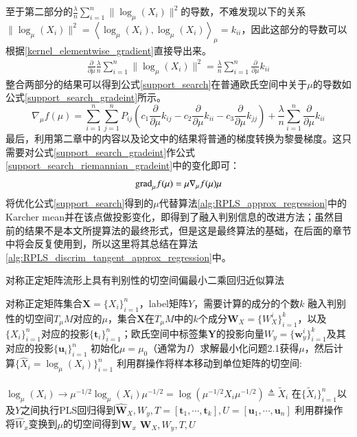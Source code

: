 至于第二部分的$\frac{\lambda}{n}\sum_{i=1}^{n} \|\log_{\mu}(X_i)\|^2$的导数，不难发现以下的关系$\|\log_{\mu}(X_i)\|^2=\left<\log_{\mu}(X_i),\log_{\mu}(X_i)\right>_{\mu}=k_{ii}$，因此这部分的导数可以根据\ref{kernel_elementwise_gradient}直接导出来。
\begin{equation}
\label{support_search_part2_gradeint}
\begin{split}
\frac{\partial}{\partial \mu}\frac{\lambda}{n}\sum_{i=1}^{n} \|\log_{\mu}(X_i)\|^2=\frac{\lambda}{n}\sum_{i=1}^{n}\frac{\partial}{\partial \mu}k_{ii}
\end{split}
\end{equation}
整合两部分的结果可以得到公式\ref{support_search}在普通欧氏空间中关于$\mu$的导数如公式\ref{support_search_gradeint}所示。
\begin{equation}
\label{support_search_gradeint}
\nabla_{\mu} f(\mu)=\sum_{i=1}^{n}\sum_{j=1}^{n}P_{ij}\left(c_1\frac{\partial}{\partial \mu}k_{ij}-c_2\frac{\partial}{\partial \mu}k_{ii}-c_3\frac{\partial}{\partial \mu}k_{jj}\right)+\frac{\lambda}{n}\sum_{i=1}^{n}\frac{\partial}{\partial \mu}k_{ii}
\end{equation}
最后，利用第二章中的内容以及论文\cite{Statistics_SLEDML,Maniopt_DiscreteCurveFitting}中的结果将普通的梯度转换为黎曼梯度。这只需要对公式\ref{support_search_gradeint}作公式\ref{support_search_riemannian_gradeint}中的变化即可：
\begin{equation}
\label{support_search_riemannian_gradeint}
{\rm grad}_{\mu}f(\mu)=\mu \nabla_{\mu} f(\mu) \mu
\end{equation}
将优化公式\ref{support_search}得到的$\mu$代替算法\ref{alg:RPLS_approx_regression}中的Karcher mean并在该点做投影变化，即得到了融入判别信息的改进方法；虽然目前的结果不是本文所提算法的最终形式，但是这是最终算法的基础，在后面的章节中将会反复使用到，所以这里将其总结在算法\ref{alg:RPLS_discrim_tangent_approx_regression}中。
\begin{algorithm}
\caption{对称正定矩阵流形上具有判别性的切空间偏最小二乘回归近似算法}
\label{alg:RPLS_discrim_tangent_approx_regression}
\begin{algorithmic}[1]
\REQUIRE 对称正定矩阵集合$\bm{X}=\{X_i\}_{i=1}^{n}$，label矩阵${Y}$，需要计算的成分的个数$k$
\ENSURE 融入判别性的切空间$T_{\mu}M$对应的$\mu$，集合$\bm{X}$在$T_{\mu}M$中的$k$个成分$\bm{W}_X=\{W_{X}^{i}\}_{i=1}^{k}$，以及$\{X_i\}_{i=1}^{n}$对应的投影$\{\bm{t}_i\}_{i=1}^{n}$；欧氏空间中标签集$\bm{Y}$的投影向量$W_y=\{\bm{w}_{y}^{i}\}_{i=1}^{k}$及其对应的投影$\{\bm{u}_i\}_{i=1}^{n}$
\STATE 初始化$\mu=\mu_0$（通常为$I$）求解最小化问题2.1获得$\mu$，然后计算$\{\hat{X}_i=\log_{\mu}(X_i)\}_{i=1}^{n}$
\STATE 利用群操作将样本移动到单位矩阵的切空间:\\
 ~~~~~~~~~~~~~~~~~~~~$\log_{\mu}(X_i)\rightarrow \mu^{-1/2}\log_{\mu}(X_i)\mu^{-1/2}=\log(\mu^{-1/2}X_i\mu^{-1/2})\triangleq \tilde{X}_i$
\STATE 在$\{\tilde{X}_{i}\}_{i=1}^{n}$以及${Y}$之间执行PLS回归得到$\hat{\bm{W}}_X,W_y,T=[\bm{t}_1,\cdots,\bm{t}_k],U=[\bm{u}_1,\cdots,\bm{u}_n]$
\STATE 利用群操作将$\hat{W}_x$变换到$\mu$的切空间得到$\bm{W}_x$
\RETURN $\bm{W}_X,W_y,T,U$
\end{algorithmic}
\end{algorithm}
